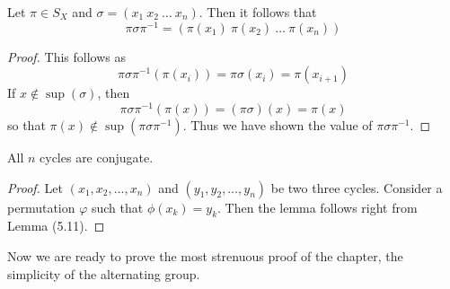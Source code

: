 \begin{lemma}
    Let $\pi \in S_X$ and $\sigma = (x_1\ x_2\ \dots\ x_n)$. Then it follows that
    \[\pi \sigma \pi^{-1} = (\pi(x_1)\ \pi(x_2)\ \dots\ \pi(x_n))\]
\end{lemma}
\begin{proof}
    This follows as
    \[ \pi \sigma \pi^{-1} (\pi(x_i)) = \pi \sigma(x_i) = \pi(x_{i+1}) \]
    If $x \notin \sup(\sigma)$, then
    \[ \pi \sigma \pi^{-1} (\pi (x)) = (\pi \sigma) (x) = \pi(x) \]
    so that $\pi(x) \notin \sup(\pi \sigma \pi^{-1})$. Thus we have shown the value of $\pi \sigma \pi^{-1}$.
\end{proof}

\begin{corollary}
    All $n$ cycles are conjugate.
\end{corollary}
\begin{proof}
    Let $(x_1, x_2, \dots, x_n)$ and $(y_1, y_2, \dots, y_n)$ be two three cycles. Consider a permutation $\varphi$ such that $\phi(x_k) = y_k$. Then the lemma follows right from Lemma (5.11).
\end{proof}

Now we are ready to prove the most strenuous proof of the chapter, the simplicity of the alternating group.

